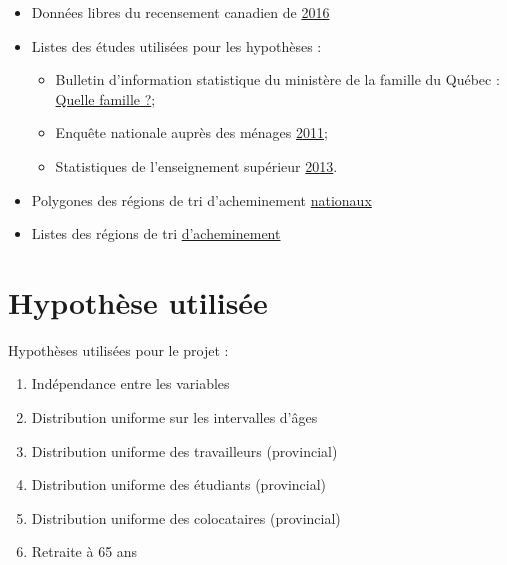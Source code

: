 \documentclass[11pt,french]{report}\usepackage[]{graphicx}\usepackage[]{color}
\begin{document}
\begin{itemize}
\item Données libres du recensement canadien de \href{http://www12.statcan.gc.ca/census-recensement/2016/dp-pd/prof/details/download-telecharger/comp/page_dl-tc.cfm?Lang=F}{2016} 
\item Listes des études utilisées pour les hypothèses :
     \begin{itemize}
     \item Bulletin d'information statistique du ministère de la famille du Québec : \href{https://www.mfa.gouv.qc.ca/fr/Famille/chiffres-famille-quebec/bulletin_quelle_famille/Pages/aut2013_no1_tab4.aspx}{Quelle famille ?};
     \item Enquête nationale auprès des ménages \href{http://www12.statcan.gc.ca/nhs-enm/2011/dp-pd/dt-td/Rp-fra.cfm?TABID=2&LANG=F&A=R&APATH=3&DETAIL=0&DIM=0&FL=A&FREE=0&GC=24&GL=-1&GID=1118301&GK=1&GRP=1&O=D&PID=106042&PRID=0&PTYPE=105277&S=0&SHOWALL=0&SUB=0&Temporal=2013&THEME=96&VID=0&VNAMEE=&VNAMEF=&D1=2&D2=0&D3=0&D4=0&D5=0&D6=0}{2011};
     \item Statistiques de l'enseignement supérieur \href{http://www.education.gouv.qc.ca/fileadmin/administration/librairies/documents/Ministere/acces_info/Statistiques/Statistiques_ES/Statistiques_enseignement_superieur_2013.pdf}{2013}.
     \end{itemize}
\item Polygones des régions de tri d'acheminement \href{http://www12.statcan.gc.ca/census-recensement/2011/geo/bound-limit/bound-limit-2016-fra.cfm}{nationaux}
\item Listes des régions de tri \href{https://fr.wikipedia.org/wiki/Liste_des_codes_postaux_canadiens_débutant_par_J}{d'acheminement}
\end{itemize}

\section*{Hypothèse utilisée}
Hypothèses utilisées pour le projet :
\begin{enumerate}
\item Indépendance entre les variables
\item Distribution uniforme sur les intervalles d'âges
\item Distribution uniforme des travailleurs (provincial)
\item Distribution uniforme des étudiants (provincial)
\item Distribution uniforme des colocataires (provincial)
\item Retraite à 65 ans
\end{enumerate}
\end{document}
